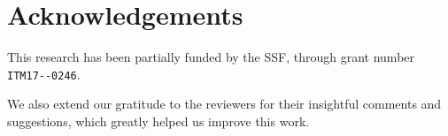 \section*{Acknowledgements}\label{paper:olguinmunoz2022airnur:acks}

This research has been partially funded by the \gls{SSF}, through grant number \verb|ITM17--0246|.

We also extend our gratitude to the reviewers for their insightful comments and suggestions, which greatly helped us improve this work.
